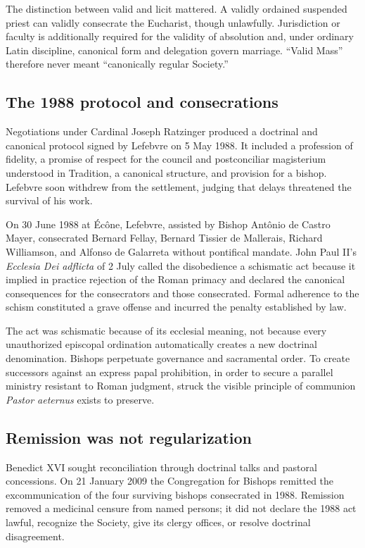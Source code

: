 The distinction between valid and licit mattered. A validly ordained suspended priest can validly consecrate the Eucharist, though unlawfully. Jurisdiction or faculty is additionally required for the validity of absolution and, under ordinary Latin discipline, canonical form and delegation govern marriage. “Valid Mass” therefore never meant “canonically regular Society.”

\subsection{The 1988 protocol and consecrations}

Negotiations under Cardinal Joseph Ratzinger produced a doctrinal and canonical protocol signed by Lefebvre on 5 May 1988. It included a profession of fidelity, a promise of respect for the council and postconciliar magisterium understood in Tradition, a canonical structure, and provision for a bishop. Lefebvre soon withdrew from the settlement, judging that delays threatened the survival of his work.

On 30 June 1988 at Écône, Lefebvre, assisted by Bishop Antônio de Castro Mayer, consecrated Bernard Fellay, Bernard Tissier de Mallerais, Richard Williamson, and Alfonso de Galarreta without pontifical mandate. John Paul II's \emph{Ecclesia Dei adflicta} of 2 July called the disobedience a schismatic act because it implied in practice rejection of the Roman primacy and declared the canonical consequences for the consecrators and those consecrated. Formal adherence to the schism constituted a grave offense and incurred the penalty established by law.

The act was schismatic because of its ecclesial meaning, not because every unauthorized episcopal ordination automatically creates a new doctrinal denomination. Bishops perpetuate governance and sacramental order. To create successors against an express papal prohibition, in order to secure a parallel ministry resistant to Roman judgment, struck the visible principle of communion \emph{Pastor aeternus} exists to preserve.

\subsection{Remission was not regularization}

Benedict XVI sought reconciliation through doctrinal talks and pastoral concessions. On 21 January 2009 the Congregation for Bishops remitted the excommunication of the four surviving bishops consecrated in 1988. Remission removed a medicinal censure from named persons; it did not declare the 1988 act lawful, recognize the Society, give its clergy offices, or resolve doctrinal disagreement.


